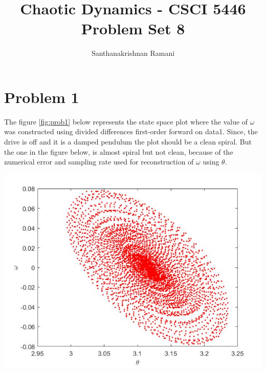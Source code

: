 \documentclass{article}
\title{\textbf{Chaotic Dynamics - CSCI 5446} \\
Problem Set 8}
\author{Santhanakrishnan Ramani}
\begin{document}
\maketitle

\section*{Problem 1}
The figure \ref{fig:prob1} below represents the state space plot where the value of $\omega$ was constructed using divided differences first-order forward on data1. Since, the drive is off and it is a damped pendulum the plot should be a clean spiral. But the one in the figure below, is almost spiral but not clean, because of the numerical error and sampling rate used for reconstruction of $\omega$ using $\theta$.

\begin{minipage}{\linewidth}
{
\centering 
\includegraphics[scale=0.4]{images/prob1.jpg}
\label{fig:prob1}
}
\end{minipage}
\end{document}
